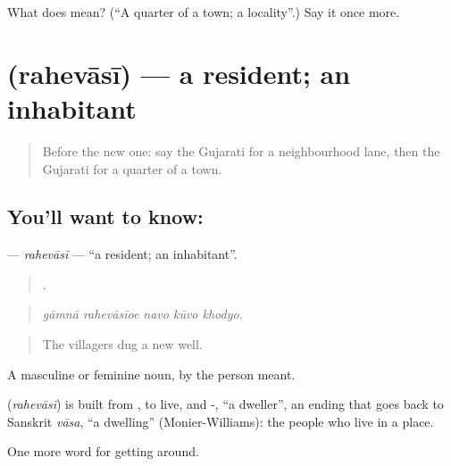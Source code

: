 \begin{tcolorbox}[breakable,colback=teal!4,colframe=teal!35!black,title={Before you move on}]
What does  mean? (\textquotedblleft{}A quarter of a town; a locality\textquotedblright{}.) Say it once more.
\end{tcolorbox}
\section[\texorpdfstring{\gu{રહેવાસી} (rahevāsī)}{રહેવાસી (rahevāsī)}]{ (rahevāsī) — a resident; an inhabitant}

\label{lesson:GU-C419-rahevasi}



\begin{quote}
Before the new one: say the Gujarati for a neighbourhood lane, then the Gujarati for a quarter of a town.
\end{quote}

\subsection*{You'll want to know: }
\textbf{} — \emph{rahevāsī} — \textquotedblleft{}a resident; an inhabitant\textquotedblright{}.

\begin{quote}
    .
\end{quote}

\begin{quote}
\emph{gāmnā rahevāsīoe navo kūvo khodyo.}
\end{quote}

\begin{quote}
The villagers dug a new well.
\end{quote}

A masculine or feminine noun, by the person meant.

\begin{cousinweb}
\textbf{} (\emph{rahevāsī}) is built from , to live, and -, \textquotedblleft{}a dweller\textquotedblright{}, an ending that goes back to Sanskrit \emph{vāsa}, \textquotedblleft{}a dwelling\textquotedblright{} (Monier-Williams): the people who live in a place.
\end{cousinweb}

\begin{grammarlens}[title={What you've built}]
One more word for getting around.
\end{grammarlens}

